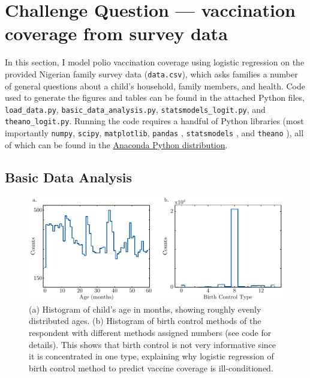 \documentclass[prl,onecolumn,amsmath,amssymb,superscriptaddress,notitlepage]{revtex4-1}
\begin{document}
\section{Challenge Question --- vaccination coverage from survey data}

In this section, I model polio vaccination coverage using logistic regression on the provided Nigerian family survey data (\verb|data.csv|), which asks families a number of general questions about a child's household, family members, and health. Code used to generate the figures and tables can be found in the attached Python files, \verb|load_data.py|, \verb|basic_data_analysis.py|, \verb|statsmodels_logit.py|, and \verb|theano_logit.py|. Running the code requires a handful of Python libraries (most importantly \verb|numpy|, \verb|scipy|, \verb|matplotlib|, \verb|pandas| \cite{mckinney2011}, \verb|statsmodels| \cite{seabold2010}, and \verb|theano| \cite{theano2016}), all of which can be found in the \href{https://www.continuum.io/downloads}{Anaconda Python distribution}. 

\subsection{Basic Data Analysis}

\begin{figure}[h!]
\centering
\includegraphics[scale=0.9]{age_histogram.pdf}
\caption{(a) Histogram of child's age in months, showing roughly evenly distributed ages. (b) Histogram of birth control methods of the respondent with different methods assigned numbers (see code for details). This shows that birth control is not very informative since it is concentrated in one type, explaining why logistic regression of birth control method to predict vaccine coverage is ill-conditioned.}\label{histograms}
\end{figure}
\end{document}
